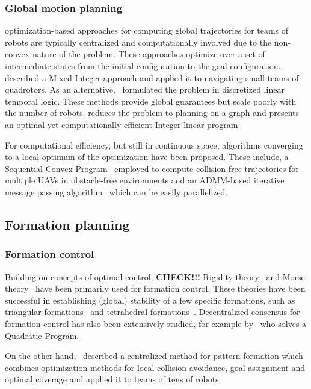 \subsubsection{Global motion planning}
optimization-based approaches for computing global trajectories for teams of robots are typically centralized and computationally involved due to the non-convex nature of the problem. These approaches optimize over a set of intermediate states from the initial configuration to the goal configuration.
\cite{Mellinger:2012fi} described a Mixed Integer approach and applied it to navigating small teams of quadrotors. As an alternative,~\cite{Saha:2014vi} formulated the problem in discretized linear temporal logic. These methods provide global guarantees but scale poorly with the number of robots. \cite{Yu:2013ij} reduces the problem to planning on a graph and presents an optimal yet computationally efficient Integer linear program.

For computational efficiency, but still in continuous space, algorithms converging to a local optimum of the optimization have been proposed. These include, a Sequential Convex Program~\cite{augugliaro12} employed to compute collision-free trajectories for multiple UAVs in obstacle-free environments and an ADMM-based iterative message passing algorithm~\cite{Bento:2013td} which can be easily parallelized.

\subsection{Formation planning}

\subsubsection{Formation control}
Building on concepts of optimal control, \textbf{CHECK!!!} Rigidity theory~\cite{Eren.Belhumeur.ea:02} and Morse theory~\cite{Anderson:11} have been primarily used for formation control. These theories have been successful in establishing (global) stability of a few specific formations, such as triangular formations~\cite{Cao.Morse.ea:11} and tetrahedral formations~\cite{Anderson.Yu.ea:10}. Decentralized consensus for formation control has also been extensively studied, for example by~\cite{montijano} who solves a Quadratic Program.

On the other hand,~\cite{alonsomora12ijrr} described a centralized method for pattern formation which combines optimization methods for local collision avoidance, goal assignment and optimal coverage and applied it to teams of tens of robots.

